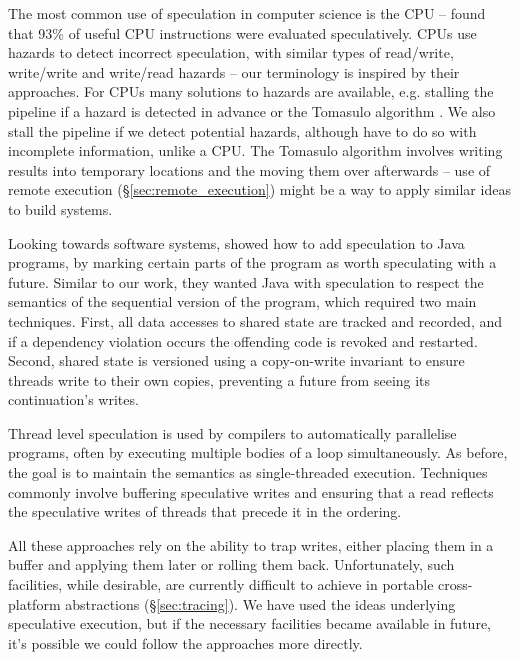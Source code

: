 The most common use of speculation in computer science is the CPU -- \citet{swanson_cpu_speculation} found that 93\% of useful CPU instructions were evaluated speculatively. CPUs use hazards to detect incorrect speculation, with similar types of read/write, write/write and write/read hazards \cite{patterson_cpu_design} -- our terminology is inspired by their approaches. For CPUs many solutions to hazards are available, e.g. stalling the pipeline if a hazard is detected in advance or the Tomasulo algorithm \cite{tomasulo}. We also stall the pipeline if we detect potential hazards, although have to do so with incomplete information, unlike a CPU. The Tomasulo algorithm involves writing results into temporary locations and the moving them over afterwards -- use of remote execution (\S\ref{sec:remote_execution}) might be a way to apply similar ideas to build systems.

Looking towards software systems, \citet{welc2005safe} showed how to add speculation to Java programs, by marking certain parts of the program as worth speculating with a future. Similar to our work, they wanted Java with speculation to respect the semantics of the sequential version of the program, which required two main techniques. First, all data accesses to shared state are tracked and recorded, and if a dependency violation occurs the offending code is revoked and restarted.  Second, shared state is versioned using a copy-on-write invariant to ensure threads write to their own copies, preventing a future from seeing its continuation's writes.

Thread level speculation \cite{steffan1998potential} is used by compilers to automatically parallelise programs, often by executing multiple bodies of a loop simultaneously. As before, the goal is to maintain the semantics as single-threaded execution. Techniques commonly involve buffering speculative writes \cite{steffan2000scalable} and ensuring that a read reflects the speculative writes of threads that precede it in the ordering.

All these approaches rely on the ability to trap writes, either placing them in a buffer and applying them later or rolling them back. Unfortunately, such facilities, while desirable, are currently difficult to achieve in portable cross-platform abstractions (\S\ref{sec:tracing}). We have used the ideas underlying speculative execution, but if the necessary facilities became available in future, it's possible we could follow the approaches more directly.
